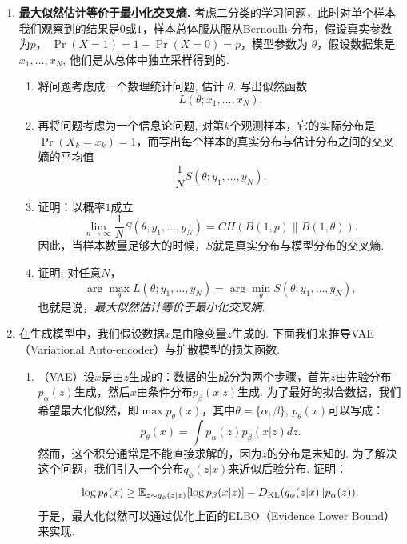 \begin{enumerate}[wide, labelindent=0pt]
    \item \label{exercise:cross-entropy-maximum-likelihood} \textbf{最大似然估计等价于最小化交叉熵. }考虑二分类的学习问题，此时对单个样本我们观察到的结果是$0$或$1$，样本总体服从服从Bernoulli 分布，假设真实参数为$p$， $\Pr(X=1)=1-\Pr(X=0)=p$，模型参数为 $\theta$，假设数据集是 $x_1,\dots,x_N$, 他们是从总体中独立采样得到的.
    \begin{enumerate}
        \item 将问题考虑成一个数理统计问题, 估计 $\theta$. 写出似然函数 
        \[L(\theta ; x_1, \ldots, x_N).\]
        \item 再将问题考虑为一个信息论问题, 对第$k$个观测样本，它的实际分布是$\Pr(X_k=x_k)=1$，而写出每个样本的真实分布与估计分布之间的交叉嫡的平均值
        \[\frac{1}{N}S(\theta ; y_1, \ldots, y_N).\]
        \item 证明：以概率$1$成立
        \[\lim_{n\to\infty}\frac{1}{N}S(\theta ; y_1, \ldots, y_N)=CH(B(1,p)\| B(1,\theta)).\]
        因此，当样本数量足够大的时候，$S$就是真实分布与模型分布的交叉熵.
        \item 证明: 对任意$N$，
        \[\arg\max_\theta L(\theta ; y_1, \ldots, y_N)=\arg\min _\theta S(\theta ; y_1, \ldots, y_N),\]
        也就是说，\textit{最大似然估计等价于最小化交叉嫡}.
    \end{enumerate}

    \item \label{exercise:diffusion-model-loss}
    在生成模型中，我们假设数据$x$是由隐变量$z$生成的. 下面我们来推导VAE（Variational Auto-encoder）与扩散模型的损失函数.
    \begin{enumerate}
        \item （VAE）设$x$是由$z$生成的：数据的生成分为两个步骤，首先$z$由先验分布$p_{\alpha}(z)$生成，然后$x$由条件分布$p_{\beta}(x|z)$生成. 为了最好的拟合数据，我们希望最大化似然，即$\max p_{\theta}(x)$，其中$\theta = \{\alpha, \beta\}$, $p_{\theta}(x)$可以写成：
        \[
            p_{\theta}(x) = \int p_{\alpha}(z)p_{\beta}(x|z)dz.
        \]
        然而，这个积分通常是不能直接求解的，因为$z$的分布是未知的. 为了解决这个问题，我们引入一个分布$q_{\phi}(z|x)$来近似后验分布. 证明：
        \[
            \log p_{\theta}(x) \geq \mathbb{E}_{z\sim q_{\phi}(z|x)}[\log p_{\beta}(x|z)] - D_{\mathrm{KL}}(q_{\phi}(z|x)\Vert p_{\alpha}(z)).
        \]
        于是，最大化似然可以通过优化上面的ELBO（Evidence Lower Bound）来实现.


\end{enumerate}
\end{enumerate}
